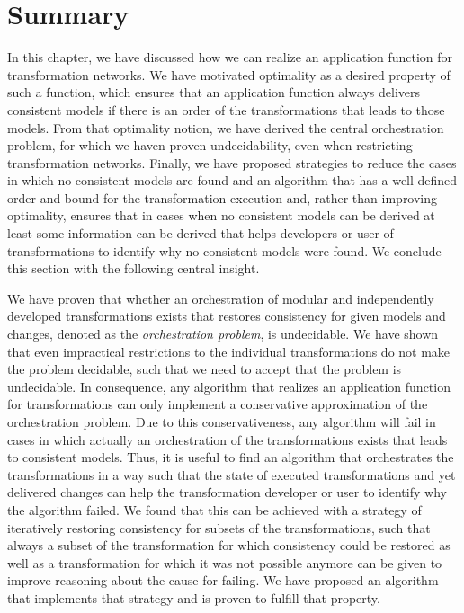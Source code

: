 \section{Summary}

In this chapter, we have discussed how we can realize an application function for transformation networks.
We have motivated optimality as a desired property of such a function, which ensures that an application function always delivers consistent models if there is an order of the transformations that leads to those models. 
From that optimality notion, we have derived the central orchestration problem, for which we haven proven undecidability, even when restricting transformation networks.
Finally, we have proposed strategies to reduce the cases in which no consistent models are found and an algorithm that has a well-defined order and bound for the transformation execution and, rather than improving optimality, ensures that in cases when no consistent models can be derived at least some information can be derived that helps developers or user of transformations to identify why no consistent models were found.
We conclude this section with the following central insight.

\begin{insight}[Orchestration]
    We have proven that whether an orchestration of modular and independently developed transformations exists that restores consistency for given models and changes, denoted as the \emph{orchestration problem}, is undecidable.
    We have shown that even impractical restrictions to the individual transformations do not make the problem decidable, such that we need to accept that the problem is undecidable.
    In consequence, any algorithm that realizes an application function for transformations can only implement a conservative approximation of the orchestration problem.
    Due to this conservativeness, any algorithm will fail in cases in which actually an orchestration of the transformations exists that leads to consistent models.
    Thus, it is useful to find an algorithm that orchestrates the transformations in a way such that the state of executed transformations and yet delivered changes can help the transformation developer or user to identify why the algorithm failed.
    We found that this can be achieved with a strategy of iteratively restoring consistency for subsets of the transformations, such that always a subset of the transformation for which consistency could be restored as well as a transformation for which it was not possible anymore can be given to improve reasoning about the cause for failing.
    We have proposed an algorithm that implements that strategy and is proven to fulfill that property.
\end{insight}